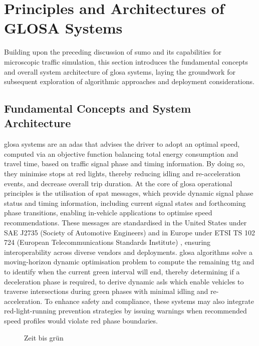 \section{Principles and Architectures of GLOSA Systems}
\label{sec:glosa}

Building upon the preceding discussion of \ac{sumo} and its capabilities for microscopic traffic simulation, this section introduces the fundamental concepts and overall system architecture of \ac{glosa} systems, laying the groundwork for subsequent exploration of algorithmic approaches and deployment considerations.

\subsection{Fundamental Concepts and System Architecture}
\label{subsec:glosa_concepts_architecture}

\ac{glosa} systems are an \ac{adas} that advises the driver to adopt an optimal speed, computed via an objective function balancing total energy consumption and travel time, based on traffic signal phase and timing information. By doing so, they minimise stops at red lights, thereby reducing idling and re-acceleration events, and decrease overall trip duration. \cite{RealTimeGLOSA2020}
\mynewline
At the core of \ac{glosa} operational principles is the utilisation of \ac{spat} messages, which provide dynamic signal phase status and timing information, including current signal states and forthcoming phase transitions, enabling in-vehicle applications to optimise speed recommendations. These messages are standardised in the United States under SAE J2735 (Society of Automotive Engineers) \cite{USDOTSPaT2022} and in Europe under ETSI TS 102 724 (European Telecommunications Standards Institute) \cite{ETSI1027242012}, ensuring interoperability across diverse vendors and deployments. \ac{glosa} algorithms solve a moving-horizon dynamic optimisation problem to compute the remaining \ac{ttg} and to identify when the current green interval will end, thereby determining if a deceleration phase is required, to derive dynamic \acp{asl} which enable vehicles to traverse intersections during green phases with minimal idling and re-acceleration. To enhance safety and compliance, these systems may also integrate red-light-running prevention strategies by issuing warnings when recommended speed profiles would violate red phase boundaries. \cite{BusesGLOSA2022}

\begin{figure}[htbp]
  \centering
  \caption{Zeit bis grün}
  \label{fig:glosa_architecture}
\end{figure}

